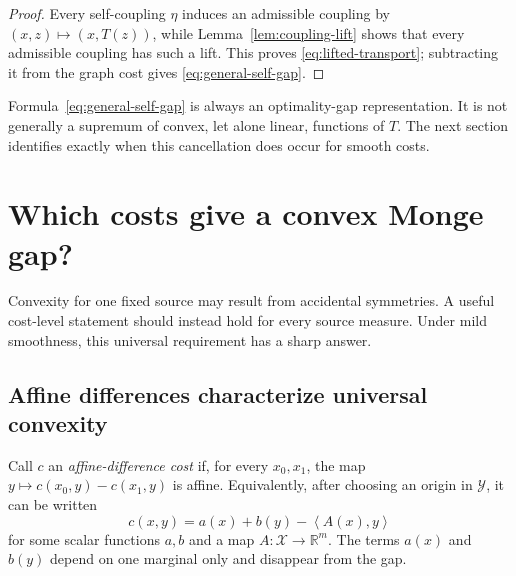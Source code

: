 \documentclass[11pt,a4paper]{article}
\theoremstyle{definition}
\theoremstyle{remark}
\newcommand{\R}{\mathbb R}
\newcommand{\ip}[2]{\left\langle #1,#2\right\rangle}
\begin{document}
\begin{proof}
Every self-coupling $\eta$ induces an admissible coupling by
$(x,z)\mapsto(x,T(z))$, while Lemma~\ref{lem:coupling-lift} shows that every
admissible coupling has such a lift. This proves
\eqref{eq:lifted-transport}; subtracting it from the graph cost gives
\eqref{eq:general-self-gap}.
\end{proof}

Formula~\eqref{eq:general-self-gap} is always an optimality-gap
representation. It is not generally a supremum of convex, let alone linear,
functions of $T$. The next section identifies exactly when this cancellation
does occur for smooth costs.

\section{Which costs give a convex Monge gap?}

Convexity for one fixed source may result from accidental symmetries. A useful
cost-level statement should instead hold for every source measure. Under mild
smoothness, this universal requirement has a sharp answer.

\subsection{Affine differences characterize universal convexity}

Call $c$ an \emph{affine-difference cost} if, for every $x_0,x_1$, the map
$y\mapsto c(x_0,y)-c(x_1,y)$ is affine. Equivalently, after choosing an
origin in $\mathcal Y$, it can be written
\begin{equation}\label{eq:affine-difference-cost}
  c(x,y)=a(x)+b(y)-\ip{A(x)}{y}
\end{equation}
for some scalar functions $a,b$ and a map $A:\mathcal X\to\R^m$. The terms
$a(x)$ and $b(y)$ depend on one marginal only and disappear from the gap.
\end{document}
